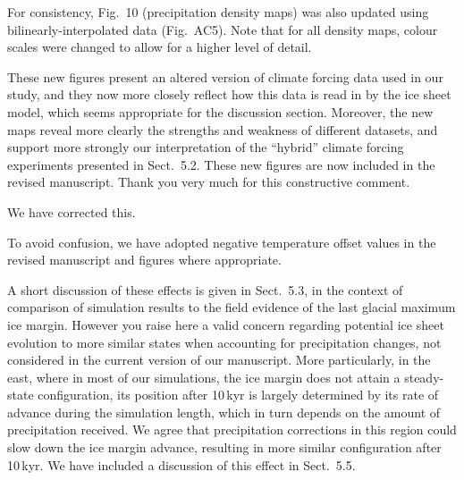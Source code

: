 \documentclass[10pt]{article}
\begin{document}
For consistency, Fig.~10 (precipitation density maps) was also updated using bilinearly-interpolated data (Fig.~AC5). Note that for all density maps, colour scales were changed to allow for a higher level of detail.

These new figures present an altered version of climate forcing data used in our study, and they now more closely reflect how this data is read in by the ice sheet model, which seems appropriate for the discussion section. Moreover, the new maps reveal more clearly the strengths and weakness of different datasets, and support more strongly our interpretation of the ``hybrid'' climate forcing experiments presented in Sect.~5.2. These new figures are now included in the revised manuscript. Thank you very much for this constructive comment.


We have corrected this.


To avoid confusion, we have adopted negative temperature offset values in the revised manuscript and figures where appropriate.


A short discussion of these effects is given in Sect.~5.3, in the context of comparison of simulation results to the field evidence of the last glacial maximum ice margin. However you raise here a valid concern regarding potential ice sheet evolution to more similar states when accounting for precipitation changes, not considered in the current version of our manuscript. More particularly, in the east, where in most of our simulations, the ice margin does not attain a steady-state configuration, its position after 10\,kyr is largely determined by its rate of advance during the simulation length, which in turn depends on the amount of precipitation received. We agree that precipitation corrections in this region could slow down the ice margin advance, resulting in more similar configuration after 10\,kyr. We have included a discussion of this effect in Sect.~5.5.
\end{document}
